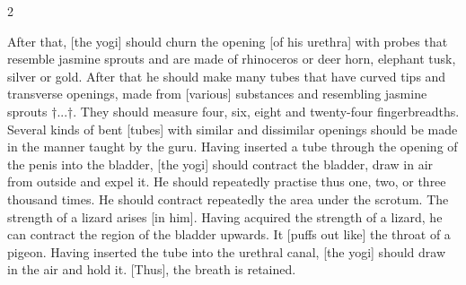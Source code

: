 \begin{nohyp}
\begin{multicols}{2}
\begin{eng}
After that, [the yogi] should churn the opening [of his urethra] with probes that resemble jasmine sprouts and are made of rhinoceros or deer horn, elephant tusk, silver or gold. After that he should make many tubes that have curved tips and transverse openings, made from [various] substances and resembling jasmine sprouts †...†. They should measure four, six, eight and twenty-four fingerbreadths.  Several kinds of bent [tubes] with similar and dissimilar openings should be made in the manner taught by the guru. Having inserted a tube through the opening of the penis into the bladder, [the yogi] should contract the bladder, draw in air from outside and expel it. He should repeatedly practise thus one, two, or three thousand times. He should contract repeatedly the area under the scrotum. The strength of a lizard arises [in him]. Having acquired the strength of a lizard, he can contract the region of the bladder upwards. It [puffs out like] the throat of a pigeon. Having inserted the tube into the urethral canal, [the yogi] should draw in the air and hold it. [Thus], the breath is retained.
\end{eng}
\end{multicols}
\end{nohyp}

\newpage

